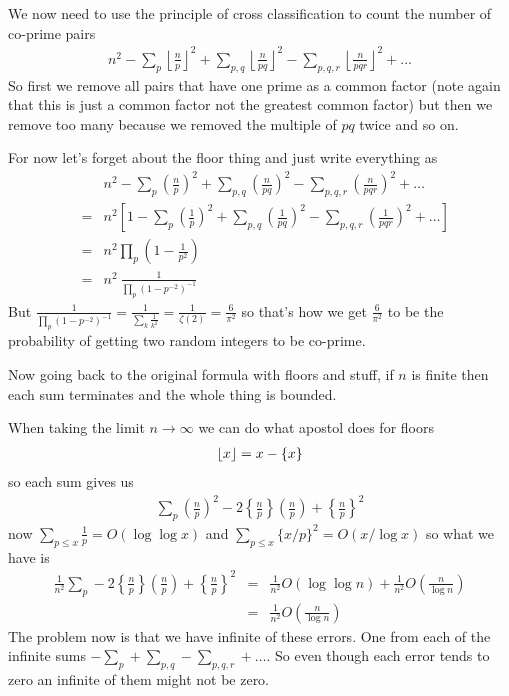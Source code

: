 \documentclass[aps,preprint,preprintnumbers,nofootinbib,showpacs,prd]{revtex4-1}
\newcommand{\nbea}{\begin{eqnarray*}}
\newcommand{\neea}{\end{eqnarray*}}
\DeclarePairedDelimiter{\floor}{\lfloor}{\rfloor}
\begin{document}
\begin{enumerate}
We now need to use the principle of cross classification to count the number of co-prime pairs 
%
\nbea
n^2 - \sum_p \left \lfloor \frac{n}{p}\right \rfloor^2 + \sum_{p,q} \left \lfloor \frac{n}{pq}\right \rfloor^2 - \sum_{p,q,r} \left \lfloor \frac{n}{pqr}\right \rfloor^2 + \dots
\neea
%
So first we remove all pairs that have one prime as a common factor (note again that this is just a common factor not the greatest common factor) but then we remove too many because we removed the multiple of $pq$ twice and so on.

For now let's forget about the floor thing and just write everything as
%
\nbea
&& n^2 - \sum_p \left ( \frac{n}{p}\right )^2 + \sum_{p,q} \left ( \frac{n}{pq}\right )^2 - \sum_{p,q,r} \left ( \frac{n}{pqr}\right )^2 + \dots \\
& = & n^2 \left \lbrack 1 - \sum_p \left ( \frac{1}{p}\right )^2 + \sum_{p,q} \left ( \frac{1}{pq}\right )^2 - \sum_{p,q,r} \left ( \frac{1}{pqr}\right )^2 + \dots \right \rbrack \\
& = & n^2 \prod_p \left ( 1- \frac{1}{p^2}\right ) \\
& = & n^2 ~ \frac{1}{\prod_p \left ( 1- p^{-2}\right )^{-1}} 
\neea
%
But $\frac{1}{\prod_p \left ( 1- p^{-2}\right )^{-1}} = \frac{1}{\sum_k \frac{1}{k^2}} = \frac{1}{\zeta(2)} = \frac{6}{\pi^2}$ so that's how we get $\frac{6}{\pi^2}$ to be the probability of getting two random integers to be co-prime.

Now going back to the original formula with floors and stuff, if $n$ is finite then each sum terminates and the whole thing is bounded.

When taking the limit $n \to \infty$ we can do what apostol does for floors
%
\nbea
\floor{x} = x - \{ x \}
\neea
%
so each sum gives us
%
\nbea
\sum_p \left ( \frac{n}{p} \right )^2 - 2 \left \{ \frac{n}{p} \right \} \left ( \frac{n}{p} \right ) + \left \{ \frac{n}{p} \right \}^2
\neea
%
now $\sum_{p \le x} \frac{1}{p} = O(\log\log x)$ and $\sum_{p \le x} \{x/p\}^2 = O(x/\log x)$ so what we have is 
%
\nbea
\frac{1}{n^2} \sum_p - 2 \left \{ \frac{n}{p} \right \} \left ( \frac{n}{p} \right ) + \left \{ \frac{n}{p} \right \}^2 & = &\frac{1}{n^2} O(\log\log n) + \frac{1}{n^2}O\left(\frac{n}{\log n}\right) \\
& = & \frac{1}{n^2} O\left ( \frac{n}{\log n} \right )
\neea
%
The problem now is that we have infinite of these errors. One from each of the infinite sums $-\sum_p + \sum_{p,q} - \sum_{p,q,r} + \dots$. So even though each error tends to zero an infinite of them might not be zero.


\end{enumerate}
\end{document}
